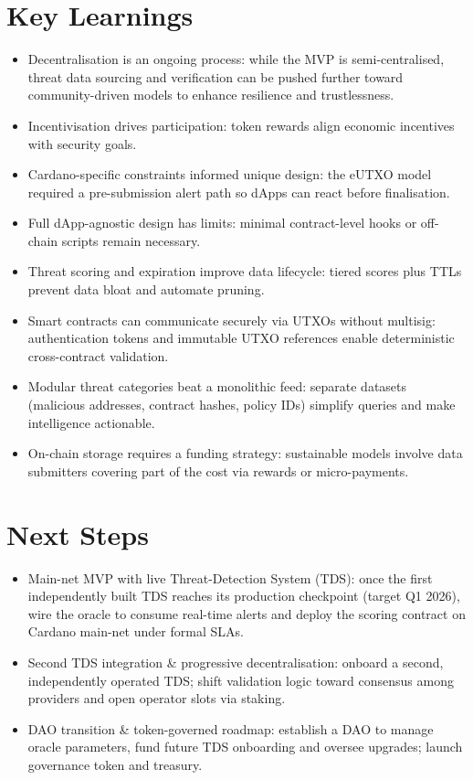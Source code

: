 \documentclass[11pt,a4paper]{article}
\begin{document}
\section*{Key Learnings}
\begin{itemize}
  \item Decentralisation is an ongoing process: while the MVP is semi-centralised, threat data sourcing and verification can be pushed further toward community-driven models to enhance resilience and trustlessness.
  \item Incentivisation drives participation: token rewards align economic incentives with security goals.
  \item Cardano-specific constraints informed unique design: the eUTXO model required a pre-submission alert path so dApps can react before finalisation.
  \item Full dApp-agnostic design has limits: minimal contract-level hooks or off-chain scripts remain necessary.
  \item Threat scoring and expiration improve data lifecycle: tiered scores plus TTLs prevent data bloat and automate pruning.
  \item Smart contracts can communicate securely via UTXOs without multisig: authentication tokens and immutable UTXO references enable deterministic cross-contract validation.
  \item Modular threat categories beat a monolithic feed: separate datasets (malicious addresses, contract hashes, policy IDs) simplify queries and make intelligence actionable.
  \item On-chain storage requires a funding strategy: sustainable models involve data submitters covering part of the cost via rewards or micro-payments.
\end{itemize}

\section*{Next Steps}
\begin{itemize}
  \item Main-net MVP with live Threat-Detection System (TDS): once the first independently built TDS reaches its production checkpoint (target Q1 2026), wire the oracle to consume real-time alerts and deploy the scoring contract on Cardano main-net under formal SLAs.
  \item Second TDS integration \& progressive decentralisation: onboard a second, independently operated TDS; shift validation logic toward consensus among providers and open operator slots via staking.
  \item DAO transition \& token-governed roadmap: establish a DAO to manage oracle parameters, fund future TDS onboarding and oversee upgrades; launch governance token and treasury.
\end{itemize}
\end{document}
